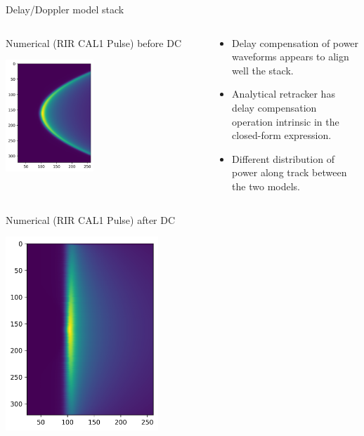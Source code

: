 \documentclass[compress,8pt]{beamer}
\begin{document}
\begin{frame}{Delay/Doppler model stack}

\medskip
\begin{columns}
\begin{column}{0.45\textwidth}\centering

Numerical (RIR CAL1 Pulse) before DC

  \includegraphics[width=0.45\textwidth]{fig/stack_num_PTRnum}

\end{column}
\begin{column}{0.45\textwidth}\centering

\begin{itemize}
 \item Delay compensation of power waveforms appears to align well the stack.
 \item Analytical retracker has delay compensation operation intrinsic in the closed-form expression.
 \item Different distribution of power along track between the two models.
\end{itemize}

  
\end{column}
\end{columns}
 
\begin{columns}
\begin{column}{0.45\textwidth}\centering

Numerical (RIR CAL1 Pulse) after DC

 \includegraphics[width=0.45\textwidth]{fig/stack_dc_num_PTRnum}
\end{column}
\begin{column}{0.45\textwidth}\centering


\end{column}
\end{columns}
\end{frame}
\end{document}
